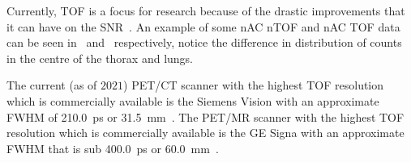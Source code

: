                 Currently, \gls{TOF} is a focus for research because of the drastic improvements that it can have on the \gls{SNR}~\parencite{Lecoq2017, Cates2018}. %
                An example of some \gls{nAC} \gls{nTOF} and \gls{nAC} \gls{TOF} data can be seen in~ and~ respectively, notice the difference in distribution of counts in the centre of the thorax and lungs.
                
                The current (as of $2021$) \gls{PET}/\gls{CT} scanner with the highest \gls{TOF} resolution which is commercially available is the Siemens Vision with an approximate \gls{FWHM} of \SI{210.0}{\pico\second} or \SI{31.5}{\milli\metre}~\parencite{VanSluis2019}. The \gls{PET}/\gls{MR} scanner with the highest \gls{TOF} resolution which is commercially available is the \gls{GE} Signa with an approximate \gls{FWHM} that is sub \SI{400.0}{\pico\second} or \SI{60.0}{\milli\metre}~\parencite{SIGNA, Hsu2017StudiesSystem, Caribe2019NEMAIsotopes}. %
            
